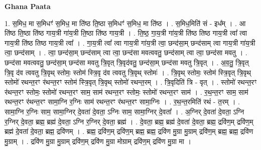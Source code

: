 \documentclass[17pt]{extarticle}
\begin{document}
\textbf{Ghana Paata } \newline

1. स॒मिध॒ मा स॒मिधꣳ॑ स॒मिध॒ मा ति॑ष्ठ ति॒ष्ठा स॒मिधꣳ॑ स॒मिध॒ मा ति॑ष्ठ । . स॒मिध॒मिति॑ सं - इध᳚म् । . आ ति॑ष्ठ ति॒ष्ठा ति॑ष्ठ गाय॒त्री गा॑य॒त्री ति॒ष्ठा ति॑ष्ठ गाय॒त्री । . ति॒ष्ठ॒ गा॒य॒त्री गा॑य॒त्री ति॑ष्ठ तिष्ठ गाय॒त्री त्वा᳚ त्वा गाय॒त्री ति॑ष्ठ तिष्ठ गाय॒त्री त्वा᳚ । . गा॒य॒त्री त्वा᳚ त्वा गाय॒त्री गा॑य॒त्री त्वा॒ छन्द॑सा॒म् छन्द॑साम् त्वा गाय॒त्री गा॑य॒त्री त्वा॒ छन्द॑साम् । . त्वा॒ छन्द॑सा॒म् छन्द॑साम् त्वा त्वा॒ छन्द॑सा मवत्ववतु॒ छन्द॑साम् त्वा त्वा॒ छन्द॑सा मवतु । . छन्द॑सा मवत्ववतु॒ छन्द॑सा॒म् छन्द॑सा मवतु त्रि॒वृत् त्रि॒वृद॑वतु॒ छन्द॑सा॒म् छन्द॑सा मवतु त्रि॒वृत् । . अ॒व॒तु॒ त्रि॒वृत् त्रि॒वृ द॑व त्ववतु त्रि॒वृथ् स्तोमः॒ स्तोम॑ स्त्रि॒वृ द॑व त्ववतु त्रि॒वृथ् स्तोमः॑ । . त्रि॒वृथ् स्तोमः॒ स्तोम॑ स्त्रि॒वृत् त्रि॒वृथ् स्तोमो॑ रथन्त॒रꣳ र॑थन्त॒रꣳ स्तोम॑ स्त्रि॒वृत् त्रि॒वृथ् स्तोमो॑ रथन्त॒रम् । . त्रि॒वृदिति॑ त्रि - वृत् । . स्तोमो॑ रथन्त॒रꣳ र॑थन्त॒रꣳ स्तोमः॒ स्तोमो॑ रथन्त॒रꣳ साम॒ साम॑ रथन्त॒रꣳ स्तोमः॒ स्तोमो॑ रथन्त॒रꣳ साम॑ । . र॒थ॒न्त॒रꣳ साम॒ साम॑ रथन्त॒रꣳ र॑थन्त॒रꣳ सामा॒ग्नि र॒ग्निः साम॑ रथन्त॒रꣳ र॑थन्त॒रꣳ सामा॒ग्निः । . र॒थ॒न्त॒रमिति॑ रथं - त॒रम् । . सामा॒ग्नि र॒ग्निः साम॒ सामा॒ग्निर् दे॒वता॑ दे॒वता॒ ऽग्निः साम॒ सामा॒ग्निर् दे॒वता᳚ । . अ॒ग्निर् दे॒वता॑ दे॒वता॒ ऽग्नि र॒ग्निर् दे॒वता॒ ब्रह्म॒ ब्रह्म॑ दे॒वता॒ ऽग्नि र॒ग्निर् दे॒वता॒ ब्रह्म॑ । . दे॒वता॒ ब्रह्म॒ ब्रह्म॑ दे॒वता॑ दे॒वता॒ ब्रह्म॒ द्रवि॑ण॒म् द्रवि॑ण॒म् ब्रह्म॑ दे॒वता॑ दे॒वता॒ ब्रह्म॒ द्रवि॑णम् । . ब्रह्म॒ द्रवि॑ण॒म् द्रवि॑ण॒म् ब्रह्म॒ ब्रह्म॒ द्रवि॑ण मु॒ग्रा मु॒ग्राम् द्रवि॑ण॒म् ब्रह्म॒ ब्रह्म॒ द्रवि॑ण मु॒ग्राम् । . द्रवि॑ण मु॒ग्रा मु॒ग्राम् द्रवि॑ण॒म् द्रवि॑ण मु॒ग्रा मोग्राम् द्रवि॑ण॒म् द्रवि॑ण मु॒ग्रा मा । \newline
\end{document}
